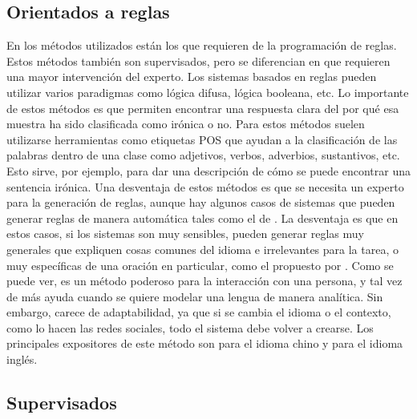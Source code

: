 \subsection{Orientados a reglas}
\par En los métodos utilizados están los que requieren de la programación de reglas. Estos métodos también son supervisados, pero se diferencian en que requieren una mayor intervención del experto. Los sistemas basados en reglas pueden utilizar varios paradigmas como lógica difusa, lógica booleana, etc. Lo importante de estos métodos es que permiten encontrar una respuesta clara del por qué esa muestra ha sido clasificada como irónica o no. Para estos métodos suelen utilizarse herramientas como etiquetas \gls{POS} que ayudan a la clasificación de las palabras dentro de una clase como adjetivos, verbos, adverbios, sustantivos, etc. Esto sirve, por ejemplo, para dar una descripción de cómo se puede encontrar una sentencia irónica. Una desventaja de estos métodos es que se necesita un experto para la generación de reglas, aunque hay algunos casos de sistemas que pueden generar reglas de manera automática tales como el de \textcite{mitra1995fuzzy}. La desventaja es que en estos casos, si los sistemas son muy sensibles, pueden generar reglas muy generales que expliquen cosas comunes del idioma e irrelevantes para la tarea, o muy específicas de una oración en particular, como el propuesto por \textcite{kotsiantis2007supervised}. Como se puede ver, es un método poderoso para la interacción con una persona, y tal vez de más ayuda cuando se quiere modelar una lengua de manera analítica. Sin embargo, carece de adaptabilidad, ya que si se cambia el idioma o el contexto, como lo hacen las redes sociales, todo el sistema debe volver a crearse. Los principales expositores de este método son \textcite{kong2011formalization} para el idioma chino  y \textcite{utsumi1995interpret} para el idioma inglés.

\subsection{Supervisados}

